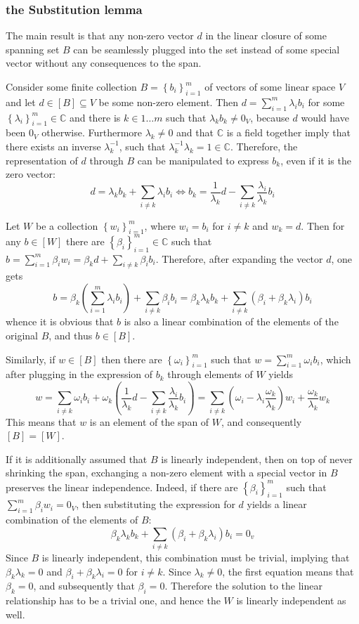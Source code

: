 \documentclass[a4paper]{article}
\newcommand{\obj}[1]{\ensuremath{\left\{ #1 \right\}}}
\newcommand{\brac}[1]{\ensuremath{\left( #1 \right)}}
\newcommand{\spn}[1]{\ensuremath{\left[ #1 \right]}}
\begin{document}
\subsubsection{the Substitution lemma} %
\label{ssub:the_substitution_lemma}
The main result is that any non-zero vector $d$ in the linear closure of some spanning set $B$ can be seamlessly plugged into the set instead of some special vector without any consequences to the span.

Consider some finite collection $B=\obj{b_i}_{i=1}^m$ of vectors of some linear space $V$ and let $d\in \spn{B}\subseteq V$ be some non-zero element. Then $d=\sum_{i=1}^m \lambda_i b_i$ for some $\obj{\lambda_i}_{i=1}^m\in \mathbb{C}$ and there is $k\in 1\ldots m$ such that $\lambda_k b_k\neq 0_V$, because $d$ would have been $0_V$ otherwise. Furthermore $\lambda_k\neq 0$ and that $\mathbb{C}$ is a field together imply that there exists an inverse $\lambda_k^{-1}$, such that $\lambda_k^{-1} \lambda_k = 1\in \mathbb{C}$. Therefore, the representation of $d$ through $B$ can be manipulated to express $b_k$, even if it is the zero vector:\[d = \lambda_k b_k + \sum_{i\neq k} \lambda_i b_i \Leftrightarrow b_k = \frac{1}{\lambda_k} d - \sum_{i\neq k} \frac{\lambda_i}{\lambda_k} b_i\]

Let $W$ be a collection $\obj{w_i}_{i=1}^m$, where $w_i=b_i$ for $i\neq k$ and $w_k=d$. Then for any $b\in \spn{W}$ there are $\obj{\beta_i}_{i=1}^m\in \mathbb{C}$ such that $b = \sum_{i=1}^m \beta_i w_i = \beta_k d + \sum_{i\neq k} \beta_i b_i$. Therefore, after expanding the vector $d$, one gets \[b = \beta_k \brac{\sum_{i=1}^m \lambda_i b_i} + \sum_{i\neq k} \beta_i b_i = \beta_k \lambda_k b_k + \sum_{i\neq k} \brac{\beta_i + \beta_k \lambda_i} b_i\] whence it is obvious that $b$ is also a linear combination of the elements of the original $B$, and thus $b\in \spn{B}$.

Similarly, if $w\in \spn{B}$ then there are $\obj{\omega_i}_{i=1}^m$ such that $w = \sum_{i=1}^m \omega_i b_i$, which after plugging in the expression of $b_k$ through elements of $W$ yields \[w = \sum_{i\neq k} \omega_i b_i + \omega_k\brac{\frac{1}{\lambda_k} d - \sum_{i\neq k} \frac{\lambda_i}{\lambda_k} b_i} = \sum_{i\neq k} \brac{\omega_i-\lambda_i\frac{\omega_k}{\lambda_k}} w_i + \frac{\omega_k}{\lambda_k} w_k\] This means that $w$ is an element of the span of $W$, and consequently $\spn{B}=\spn{W}$.

If it is additionally assumed that $B$ is linearly independent, then on top of never shrinking the span, exchanging a non-zero element with a special vector in $B$ preserves the linear independence. Indeed, if there are $\obj{\beta_i}_{i=1}^m$ such that $\sum_{i=1}^m \beta_i w_i = 0_V$, then substituting the expression for $d$ yields a linear combination of the elements of $B$:\[\beta_k \lambda_k b_k + \sum_{i\neq k} \brac{\beta_i + \beta_k \lambda_i} b_i = 0_v\] Since $B$ is linearly independent, this combination must be trivial, implying that $\beta_k \lambda_k = 0$ and $\beta_i + \beta_k \lambda_i = 0$ for $i\neq k$. Since $\lambda_k\neq 0$, the first equation means that $\beta_k = 0$, and subsequently that $\beta_i = 0$. Therefore the solution to the linear relationship has to be a trivial one, and hence the $W$ is linearly independent as well.
\end{document}

